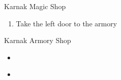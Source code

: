 \begin{paracol}{2}
\begin{shop}{Karnak Magic Shop}
    \varwb
    \begin{buy}
        \item {} \life
    \end{buy}
    \varwe
\end{shop}

\begin{enumerate}[resume]
    \item Take the left door to the armory
\end{enumerate}

\begin{shop}{Karnak Armory Shop}
    \varwb
    \begin{itemize}
        \item {}
    \end{itemize}
    \begin{buy}
        \item {} \silkRobe \space {}
    \end{buy}
    \begin{itemize}
        \item {}
    \end{itemize}
    \begin{buy}
        \item {} \mythrilKnife \space {}
        \item {} \fireRod \space {}
        \item {} \iceRod \space {}
        \item {} \thunderRod \space {}
    \end{buy}
    \varwe
\end{shop}    

\end{paracol}
